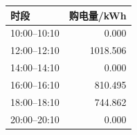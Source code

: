 \begin{tabular}{lr}
\toprule
时段 & 购电量/kWh \\
\midrule
10:00--10:10 & 0.000 \\
12:00--12:10 & 1018.506 \\
14:00--14:10 & 0.000 \\
16:00--16:10 & 810.495 \\
18:00--18:10 & 744.862 \\
20:00--20:10 & 0.000 \\
\bottomrule
\end{tabular}
